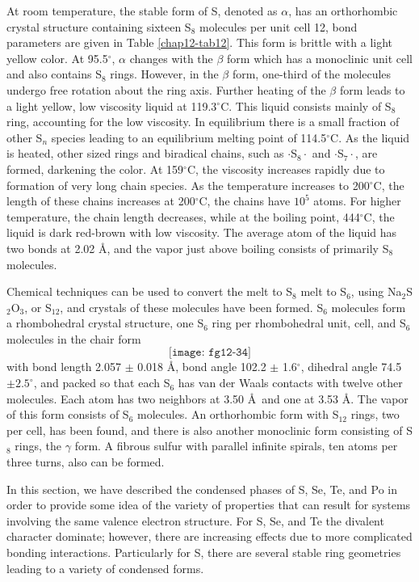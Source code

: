 At room temperature, the stable form of S, denoted as $\alpha$, has an
orthorhombic crystal structure containing sixteen S$_8$ molecules per
unit cell 12, bond parameters are given in Table \ref{chap12-tab12}.
This form is brittle with a light yellow color.  At 95.5$^{\circ}$,
$\alpha$ changes with the $\beta$ form which has a monoclinic unit
cell and also contains S$_8$ rings.  However, in the $\beta$ form,
one-third of the molecules undergo free rotation about the ring axis.
Further heating of the $\beta$ form leads to a light yellow, low
viscosity liquid at 119.3$^{\circ}$C.  This liquid consists mainly of
S$_8$ ring, accounting for the low viscosity.  In equilibrium there is
a small fraction of other S$_n$ species leading to an equilibrium
melting point of 114.5$^{\circ}$C.  As the liquid is heated, other
sized rings and biradical chains, such as $\cdot$S$_8\cdot$ and
$\cdot$S$_7\cdot$, are formed, darkening the color.  At
159$^{\circ}$C, the viscosity increases rapidly due to formation of
very long chain species.  As the temperature increases to
200$^{\circ}$C, the length of these chains increases at
200$^{\circ}$C, the chains have $10^5$ atoms.  For higher temperature,
the chain length decreases, while at the boiling point,
444$^{\circ}$C, the liquid is dark red-brown with low viscosity.  The
average atom of the liquid has two bonds at 2.02 \AA, and the vapor
just above boiling consists of primarily S$_8$ molecules.

Chemical techniques can be used to convert the melt to S$_8$ melt to 
S$_6$, using Na$_2$S$_2$O$_3$, or S$_{12}$, and crystals of
these molecules have been formed.  S$_6$
molecules form a rhombohedral crystal structure, one S$_6$ ring per 
rhombohedral unit, cell, and S$_6$ molecules
in the chair form
\begin{equation}
\texttt{[image: fg12-34]}
\end{equation}
with bond length 2.057 $\pm$ 0.018 \AA, bond angle 102.2 $\pm$
1.6$^{\circ}$, dihedral angle 74.5 $\pm 2.5^{\circ}$,
and packed so that each S$_6$ has van der Waals contacts with twelve other 
molecules.  Each atom has two neighbors at 3.50 \AA\ and one at 3.53 
\AA.  The vapor of this form consists of S$_6$ molecules.  An
orthorhombic form with S$_{12}$ rings, two per cell, has been found, 
and there is also another monoclinic form consisting of S$_8$ rings, 
the $\gamma$ form.  A fibrous sulfur with parallel infinite spirals,
ten atoms per three turns, also can be formed.

In this section, we have described the condensed phases of S, Se, Te, and Po 
in order to provide some idea of the variety of properties that can result 
for systems involving the same valence electron structure.  For S, Se, and 
Te the divalent character dominate; however, there are increasing effects 
due to more complicated bonding interactions.  Particularly for S, there are
several stable ring geometries leading to a variety of condensed forms.

